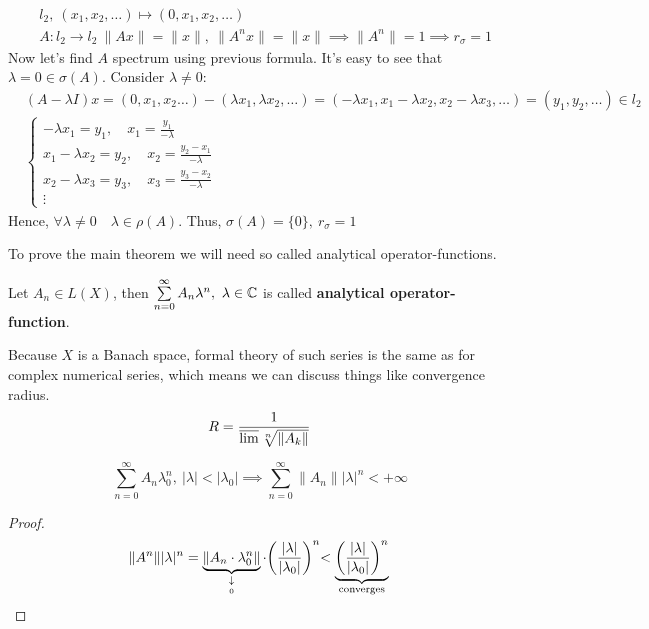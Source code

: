 \begin{note}
  \begin{align*}
    &l_2,\ (x_1, x_2, \dots) \mapsto (0, x_1, x_2, \dots) \\
    &A \colon l_2 \to l_2\ \|Ax\| = \|x\|,\ \|A^n x\| = \|x\| \implies \|A^n\| = 1 \implies r_\sigma = 1
  \end{align*}
  Now let's find $A$ spectrum using previous formula. It's easy to see that
  $\lambda = 0 \in \sigma(A)$. Consider $\lambda \neq 0$:
  \begin{align*}
    &(A - \lambda I) x = (0, x_1, x_2 \dots) - (\lambda x_1, \lambda x_2, \dots) = (-\lambda x_1, x_1 - \lambda x_2, x_2 - \lambda x_3, \dots) = (y_1, y_2, \dots) \in l_2 \\
    & \begin{cases}
      -\lambda x_1 = y_1,\quad x_1 = \frac{y_1}{-\lambda}\\
      x_1 - \lambda x_2 = y_2,\quad x_2 = \frac{y_2 - x_1}{-\lambda}\\
      x_2 - \lambda x_3 = y_3,\quad x_3 = \frac{y_3 - x_2}{-\lambda}\\
      \vdots
      \end{cases}
  \end{align*}
    Hence, $\forall \lambda \neq 0 \quad \lambda \in \rho(A)$. Thus,
    $\sigma(A) = \{0\},\ r_\sigma = 1$
\end{note}

To prove the main theorem we will need so called analytical operator-functions.
\begin{defn}
  Let $A_n \in L(X)$, then 
   $\sum\limits_{n = 0}^\infty A_n \lambda^n,\ \lambda \in \mathbb{C}$ is called
   \textbf{analytical operator-function}.
\end{defn}

\begin{note}
  Because $X$ is a Banach space, formal theory of such series is the same as for
  complex numerical series, which means we can discuss things like convergence radius.
  \[
    R = \frac{1}{\varlimsup \sqrt[n]{\|A_k\|}}
  \]
\end{note}

\begin{lemma}[Abel]
  \[
    \sum_{n = 0}^\infty A_n \lambda_0^n,\ |\lambda| < |\lambda_0| \implies
    \sum_{n = 0}^\infty \|A_n\| |\lambda|^n < +\infty
  \]
\end{lemma}

\begin{proof}\leavevmode
    \[
      \|A^n\| |\lambda|^n = \underbrace{\|A_n \cdot \lambda_0^n\|}_{\underset{0}{\downarrow}} \cdot
      \biggl( \frac{|\lambda|}{|\lambda_0|} \biggl)^n < \underbrace{\biggl(
      \frac{|\lambda|}{|\lambda_0|} \biggl)^n}_{\text{converges}} \qedhere
    \]
\end{proof}

